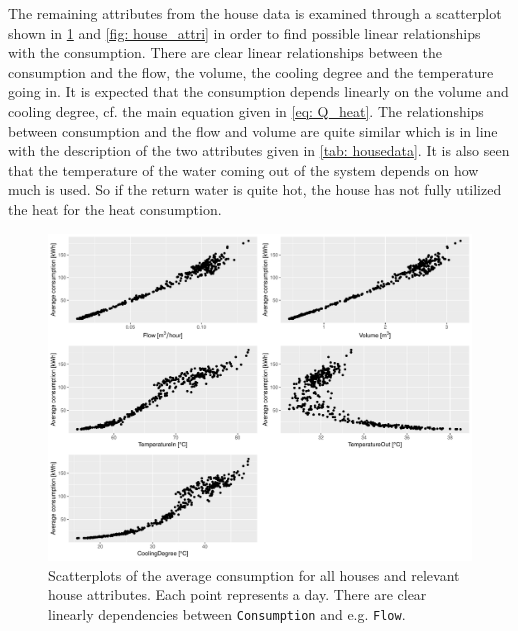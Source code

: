 \noindent The remaining attributes from the house data is examined through a scatterplot shown in \cref{fig: housepairs} and \cref{fig: house_attri} in order to find possible linear relationships with the consumption. There are clear linear relationships between the consumption and the flow, the volume, the cooling degree and the temperature going in. It is expected that the consumption depends linearly on the volume and cooling degree, cf. the main equation given in \cref{eq: Q_heat}. The relationships between consumption and the flow and volume are quite similar which is in line with the description of the two attributes given in \cref{tab: housedata}. It is also seen that the temperature of the water coming out of the system depends on how much is used. So if the return water is quite hot, 
the house has not fully utilized the heat for the heat consumption. 
\begin{figure}[H]
    \centering
    \includegraphics[width=1.\textwidth]{../../../figures/housepairs.pdf}
    \caption{Scatterplots of the average consumption for all houses and relevant house attributes. Each point represents a day. There are clear linearly dependencies between \texttt{Consumption} and e.g. \texttt{Flow}.} 
    \label{fig: housepairs}
\end{figure}


